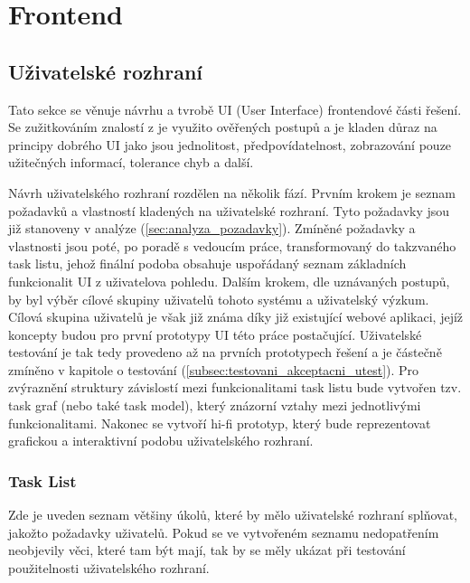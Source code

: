 \documentclass[thesis=M,czech]{FITthesis}[2012/06/26]
\begin{document}
\section{Frontend} \label{sec:navrh_frontend}

\subsection{Uživatelské rozhraní}
Tato sekce se věnuje návrhu a tvrobě UI (User Interface) frontendové části řešení. Se zužitkováním znalostí z \cite{nur} je využito ověřených postupů a je kladen důraz na principy dobrého UI jako jsou jednolitost, předpovídatelnost, zobrazování pouze užitečných informací, tolerance chyb a další. 

Návrh uživatelského rozhraní rozdělen na několik fází. Prvním krokem je seznam požadavků a vlastností kladených na uživatelské rozhraní. Tyto požadavky jsou již stanoveny v analýze (\ref{sec:analyza_pozadavky}). Zmíněné požadavky a vlastnosti jsou poté, po poradě s vedoucím práce, transformovaný do takzvaného task listu, jehož finální podoba obsahuje uspořádaný seznam základních funkcionalit UI z uživatelova pohledu. Dalším krokem, dle uznávaných postupů, by byl výběr cílové skupiny uživatelů tohoto systému a uživatelský výzkum. Cílová skupina uživatelů je však již známa díky již existující webové aplikaci, jejíž koncepty budou pro první prototypy UI této práce postačující. Uživatelské testování je tak tedy provedeno až na prvních prototypech řešení a je částečně zmíněno v kapitole o testování (\ref{subsec:testovani_akceptacni_utest}). Pro zvýraznění struktury závislostí mezi funkcionalitami task listu bude vytvořen tzv. task graf (nebo také task model), který znázorní vztahy mezi jednotlivými funkcionalitami. Nakonec se vytvoří hi-fi prototyp, který bude reprezentovat grafickou a interaktivní podobu uživatelského rozhraní.

\subsubsection{Task List} \label{subsubsec:navrh_frontend_ui_tasklist}
Zde je uveden seznam většiny úkolů, které by mělo uživatelské rozhraní splňovat, jakožto požadavky uživatelů. Pokud se ve vytvořeném seznamu nedopatřením neobjevily věci, které tam být mají, tak by se měly ukázat při testování použitelnosti uživatelského rozhraní.
\end{document}
